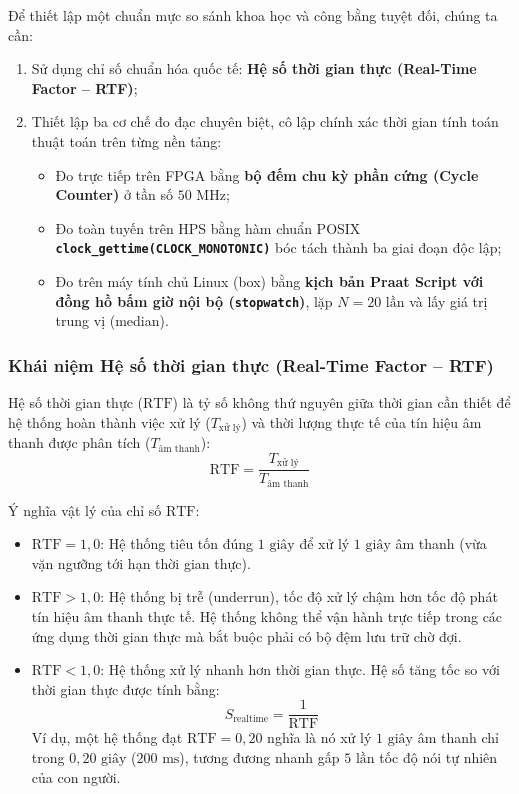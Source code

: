 Để thiết lập một chuẩn mực so sánh khoa học và công bằng tuyệt đối, chúng ta cần:
\begin{enumerate}
    \item Sử dụng chỉ số chuẩn hóa quốc tế: \textbf{Hệ số thời gian thực (Real-Time Factor -- RTF)};
    \item Thiết lập ba cơ chế đo đạc chuyên biệt, cô lập chính xác thời gian tính toán thuật toán trên từng nền tảng:
    \begin{itemize}
        \item Đo trực tiếp trên FPGA bằng \textbf{bộ đếm chu kỳ phần cứng (Cycle Counter)} ở tần số $50\text{ MHz}$;
        \item Đo toàn tuyến trên HPS bằng hàm chuẩn POSIX \textbf{\texttt{clock\_gettime(CLOCK\_MONOTONIC)}} bóc tách thành ba giai đoạn độc lập;
        \item Đo trên máy tính chủ Linux (box) bằng \textbf{kịch bản Praat Script với đồng hồ bấm giờ nội bộ (\texttt{stopwatch})}, lặp $N = 20\text{ lần}$ và lấy giá trị trung vị (median).
    \end{itemize}
\end{enumerate}

\subsubsection*{Khái niệm Hệ số thời gian thực (Real-Time Factor -- RTF)}
Hệ số thời gian thực ($\text{RTF}$) là tỷ số không thứ nguyên giữa thời gian cần thiết để hệ thống hoàn thành việc xử lý ($T_{\text{xử lý}}$) và thời lượng thực tế của tín hiệu âm thanh được phân tích ($T_{\text{âm thanh}}$):
\begin{equation}
    \text{RTF} = \frac{T_{\text{xử lý}}}{T_{\text{âm thanh}}}
    \label{eq:rtf_def}
\end{equation}

Ý nghĩa vật lý của chỉ số $\text{RTF}$:
\begin{itemize}
    \item $\text{RTF} = 1{,}0$: Hệ thống tiêu tốn đúng $1\text{ giây}$ để xử lý $1\text{ giây}$ âm thanh (vừa vặn ngưỡng tới hạn thời gian thực).
    \item $\text{RTF} > 1{,}0$: Hệ thống bị trễ (underrun), tốc độ xử lý chậm hơn tốc độ phát tín hiệu âm thanh thực tế. Hệ thống không thể vận hành trực tiếp trong các ứng dụng thời gian thực mà bắt buộc phải có bộ đệm lưu trữ chờ đợi.
    \item $\text{RTF} < 1{,}0$: Hệ thống xử lý nhanh hơn thời gian thực. Hệ số tăng tốc so với thời gian thực được tính bằng:
    \begin{equation}
        S_{\text{realtime}} = \frac{1}{\text{RTF}}
    \end{equation}
    Ví dụ, một hệ thống đạt $\text{RTF} = 0{,}20$ nghĩa là nó xử lý $1\text{ giây}$ âm thanh chỉ trong $0{,}20\text{ giây}$ ($200\text{ ms}$), tương đương nhanh gấp $5\text{ lần}$ tốc độ nói tự nhiên của con người.
\end{itemize}

